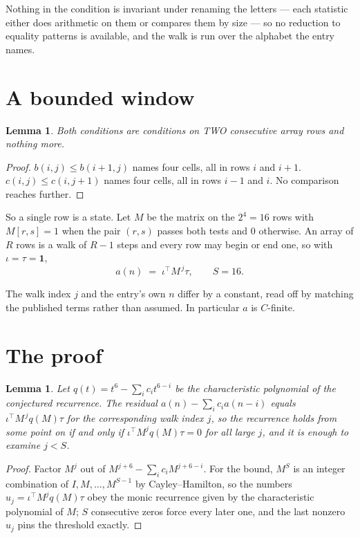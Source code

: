 \documentclass[11pt,a4paper]{article}
\theoremstyle{plain}
\newtheorem{lemma}[theorem]{Lemma}
\theoremstyle{definition}
\begin{document}
Nothing in the condition is invariant under renaming the letters --- each statistic either does
arithmetic on them or compares them by size --- so no reduction to equality patterns is
available, and the walk is run over the alphabet the entry names.

\section{A bounded window}

\begin{lemma}\label{lem:win}
Both conditions are conditions on TWO consecutive array rows and nothing more.
\end{lemma}

\begin{proof}
$b(i,j)\le b(i{+}1,j)$ names four cells, all in rows $i$ and $i+1$. $c(i,j)\le c(i,j{+}1)$
names four cells, all in rows $i-1$ and $i$. No comparison reaches further.
\end{proof}

So a single row is a state. Let $M$ be the matrix on the $2^{4}=16$ rows with
$M[r,s]=1$ when the pair $(r,s)$ passes both tests and $0$ otherwise. An array of $R$ rows is a
walk of $R-1$ steps and every row may begin or end one, so with $\iota=\tau=\mathbf{1}$,
\[
a(n)\;=\;\iota^{\!\top}M^{\,j}\tau ,\qquad S=16.
\]

The walk index $j$ and the entry's own $n$ differ by a constant, read off by matching the
published terms rather than assumed. In particular $a$ is $C$-finite.

\section{The proof}

\begin{lemma}\label{lem:crit}
Let $q(t)=t^{6}-\sum_i c_it^{6-i}$ be the characteristic polynomial of the
conjectured recurrence. The residual $a(n)-\sum_ic_ia(n-i)$ equals
$\iota^{\!\top}M^{\,j}q(M)\tau$ for the corresponding walk index $j$, so the recurrence
holds from some point on if and only if $\iota^{\!\top}M^{j}q(M)\tau=0$ for all large $j$,
and it is enough to examine $j<S$.
\end{lemma}

\begin{proof}
Factor $M^{j}$ out of $M^{j+6}-\sum_ic_iM^{j+6-i}$. For the bound, $M^{S}$
is an integer combination of $I,M,\dots,M^{S-1}$ by Cayley--Hamilton, so the numbers
$u_j=\iota^{\!\top}M^{j}q(M)\tau$ obey the monic recurrence given by the characteristic
polynomial of $M$; $S$ consecutive zeros force every later one, and the last nonzero $u_j$
pins the threshold exactly.
\end{proof}
\end{document}
